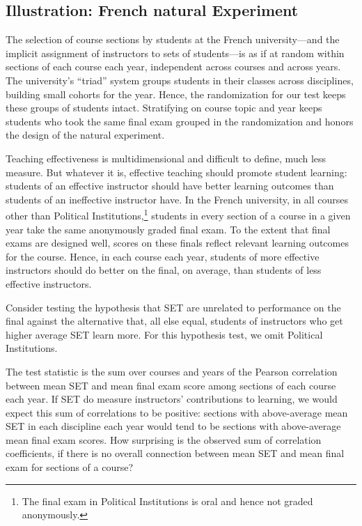 \documentclass[12pt]{article}
\begin{document}
\subsection{Illustration: French natural Experiment} \label{sec:boringMethods}
The selection of course sections by students at the French university---and the implicit 
assignment of instructors to sets of students---is as if at random within sections of each
course each year, independent across courses and across years.
The university's ``triad'' system groups students in their classes across disciplines,
building small cohorts for the year.
Hence, the randomization for our test keeps these groups of students intact.
Stratifying on course topic and year keeps students who took the same final
exam grouped in the randomization and honors the design of the natural experiment.

Teaching effectiveness is multidimensional \citep{Marsh1997} and difficult to define,
much less measure. 
But whatever it is, effective teaching should promote student learning:
students of an effective instructor should have better learning outcomes
than students of an ineffective instructor have.
In the French university, in all courses other than Political Institutions,\footnote{%
 The final exam in Political Institutions is oral and hence not graded anonymously.
}
students in every section of a course in a given year take the same anonymously graded
final exam.
To the extent that final exams are designed well, scores on these finals reflect relevant 
learning outcomes for the course.
Hence, in each course each year, students of more effective instructors should do better 
on the final, on average, than students of less effective instructors.

Consider testing the hypothesis that SET are unrelated to performance on the final
against the alternative that, all else equal, students of instructors who get higher average SET
learn more.
For this hypothesis test, we omit Political Institutions.

The test statistic is the sum over courses and years of the Pearson correlation between
mean SET and mean final exam score among sections of each course each year.
If SET do measure instructors' contributions to learning, we would expect this sum of
correlations to be positive: sections with above-average mean SET in each discipline each year
would tend to be sections with above-average mean final exam scores.
How surprising is the observed sum of correlation coefficients, if there is no overall
connection between mean SET and mean final exam for sections of a course?
\end{document}
